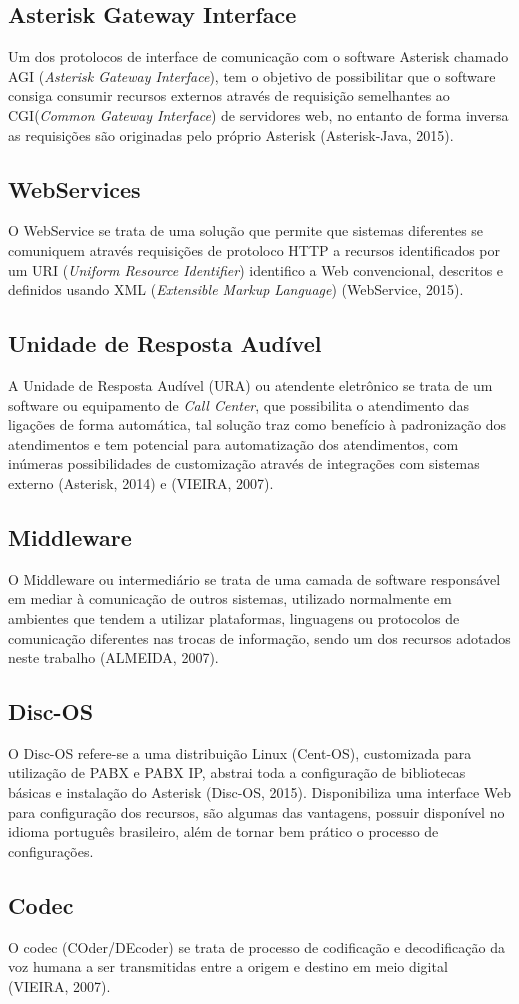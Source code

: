 \subsection{Asterisk Gateway Interface}
Um dos protolocos de interface de comunicação  com o software Asterisk chamado AGI (\textit{Asterisk Gateway Interface}), tem o objetivo de possibilitar que o software consiga consumir recursos externos através de requisição semelhantes ao CGI(\textit{Common Gateway Interface}) de servidores web, no entanto de forma inversa as requisições são originadas pelo próprio Asterisk (Asterisk-Java, 2015).

\subsection{WebServices}
O WebService se trata de uma solução que permite que sistemas diferentes se comuniquem através requisições de protoloco HTTP a recursos identificados por um URI (\textit{Uniform Resource Identifier}) identifico a Web convencional, descritos e definidos usando XML (\textit{Extensible Markup Language}) (WebService, 2015).

\subsection{Unidade de Resposta Audível}
A Unidade de Resposta Audível (URA) ou atendente eletrônico se trata de um software ou equipamento de \textit{Call Center}, que possibilita o atendimento das ligações de forma automática, tal solução traz como benefício à padronização dos atendimentos e tem potencial para automatização dos atendimentos, com inúmeras possibilidades de customização através de integrações com sistemas externo (Asterisk, 2014) e (VIEIRA, 2007).

\subsection{Middleware}
O Middleware ou intermediário se trata de uma camada de software responsável em mediar à comunicação de outros sistemas, utilizado normalmente em ambientes que tendem a utilizar plataformas, linguagens ou protocolos de comunicação diferentes nas trocas de informação, sendo um dos recursos adotados neste trabalho (ALMEIDA, 2007).

\subsection{Disc-OS}
O Disc-OS refere-se a uma distribuição Linux (Cent-OS), customizada para utilização de PABX e PABX IP, abstrai toda a configuração de bibliotecas básicas e instalação do Asterisk (Disc-OS, 2015). Disponibiliza uma interface Web para configuração dos recursos, são algumas das vantagens, possuir disponível no idioma português brasileiro, além de tornar bem prático o processo de configurações.

\subsection{Codec}
O codec (COder/DEcoder) se trata de processo de codificação e decodificação da voz humana a ser transmitidas entre a origem e destino em meio digital (VIEIRA, 2007).